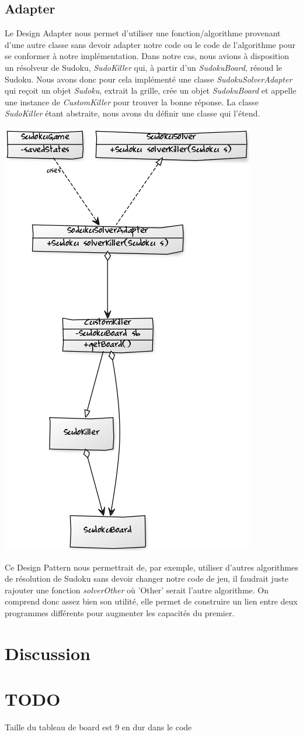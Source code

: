 \documentclass[a4paper]{article}
\begin{document}
\subsection{Adapter}
Le Design Adapter nous permet d'utiliser une fonction/algorithme provenant d'une autre classe sans devoir adapter notre code ou le code de l'algorithme pour se conformer à notre implémentation.
Dans notre cas, nous avions à disposition un résolveur de Sudoku, \textit{SudoKiller} qui, à partir d'un \textit{SudokuBoard}, résoud le Sudoku.
Nous avons donc pour cela implémenté une classe \textit{SudokuSolverAdapter} qui reçoit un objet \textit{Sudoku}, extrait la grille, crée un objet \textit{SudokuBoard} et appelle une instance de \textit{CustomKiller} pour trouver la bonne réponse.
La classe \textit{SudoKiller} étant abstraite, nous avons du définir une classe qui l'étend.
\begin{center}
\includegraphics[scale=0.7]{../diagrams/adapter.png}
\end{center}
Ce Design Pattern nous permettrait de, par exemple, utiliser d'autres algorithmes de résolution de Sudoku sans devoir changer notre code de jeu, il faudrait juste rajouter une fonction \textit{solverOther} où 'Other' serait l'autre algorithme.
On comprend donc assez bien son utilité, elle permet de construire un lien entre deux programmes différents pour augmenter les capacités du premier.
\newpage
\section{Discussion}

\section{TODO}
Taille du tableau de board est 9 en dur dans le code
\end{document}
